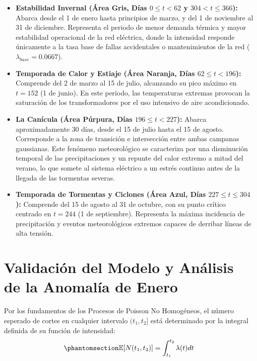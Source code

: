 \documentclass[
  spanish,
  us-letterpaper,
]{scrreprt}
\providecommand{\tightlist}{%
  \setlength{\itemsep}{0pt}\setlength{\parskip}{0pt}}
\numberwithin{equation}{section}
\theoremstyle{plain}
\theoremstyle{plain}
\theoremstyle{definition}
\theoremstyle{plain}
\theoremstyle{remark}
\begin{document}
\begin{itemize}
\tightlist
\item
  \textbf{Estabilidad Invernal (Área Gris, Días \(0 \le t < 62\) y
  \(304 < t \le 366\)):} Abarca desde el 1 de enero hasta principios de
  marzo, y del 1 de noviembre al 31 de diciembre. Representa el periodo
  de menor demanda térmica y mayor estabilidad operacional de la red
  eléctrica, donde la intensidad responde únicamente a la tasa base de
  fallas accidentales o mantenimientos de la red
  (\(\lambda_{base} = 0.0667\)).
\item
  \textbf{Temporada de Calor y Estiaje (Área Naranja, Días
  \(62 \le t < 196\)):} Comprende del 2 de marzo al 15 de julio,
  alcanzando su pico máximo en \(t = 152\) (1 de junio). En este
  periodo, las temperaturas extremas provocan la saturación de los
  transformadores por el uso intensivo de aire acondicionado.
\item
  \textbf{La Canícula (Área Púrpura, Días \(196 \le t < 227\)):} Abarca
  aproximadamente 30 días, desde el 15 de julio hasta el 15 de agosto.
  Corresponde a la zona de transición e intersección entre ambas
  campanas gaussianas. Este fenómeno meteorológico se caracteriza por
  una disminución temporal de las precipitaciones y un repunte del calor
  extremo a mitad del verano, lo que somete al sistema eléctrico a un
  estrés continuo antes de la llegada de las tormentas severas.
\item
  \textbf{Temporada de Tormentas y Ciclones (Área Azul, Días
  \(227 \le t \le 304\)):} Comprende del 15 de agosto al 31 de octubre,
  con su punto crítico centrado en \(t = 244\) (1 de septiembre).
  Representa la máxima incidencia de precipitación y eventos
  meteorológicos extremos capaces de derribar líneas de alta tensión.
\end{itemize}

\section{Validación del Modelo y Análisis de la Anomalía de
Enero}\label{validaciuxf3n-del-modelo-y-anuxe1lisis-de-la-anomaluxeda-de-enero}

Por los fundamentos de los Procesos de Poisson No Homogéneos, el número
esperado de cortes en cualquier intervalo \((t_1, t_2]\) está
determinado por la integral definida de su función de intensidad:
\begin{equation}\phantomsection\label{eq-integral-poisson}{
\mathbb{E}[N(t_1, t_2)] = \displaystyle \int_{t_1}^{t_2} \lambda(t) dt
}\end{equation}
\end{document}
